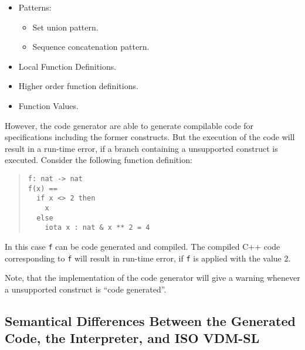 \documentclass[a4paper,dvips]{article}
\begin{document}
\begin{itemize}
\item Patterns:

  \begin{itemize}
  \item Set union pattern.
  \item Sequence concatenation pattern.
  \end{itemize}

\item Local Function Definitions.

\item Higher order function definitions.

\item Function Values. 

\end{itemize}

However, the code generator are able to generate compilable code for
specifications including the former constructs. But the execution of
the code will result in a run-time error, if a branch containing a
unsupported construct is executed. Consider the following function
definition: 

\begin{quote}
\begin{verbatim}
f: nat -> nat
f(x) ==
  if x <> 2 then
    x
  else
    iota x : nat & x ** 2 = 4
\end{verbatim}
\end{quote}

In this case {\tt f} can be code generated and compiled.  The compiled
C++ code corresponding to {\tt f} will result in run-time error, if
{\tt f} is applied with the value 2.

Note, that the implementation of the code generator will give a
warning whenever a unsupported construct is ``code generated''.


\subsection{Semantical Differences Between the Generated Code, the
  Interpreter, and ISO VDM-SL}
\end{document}
